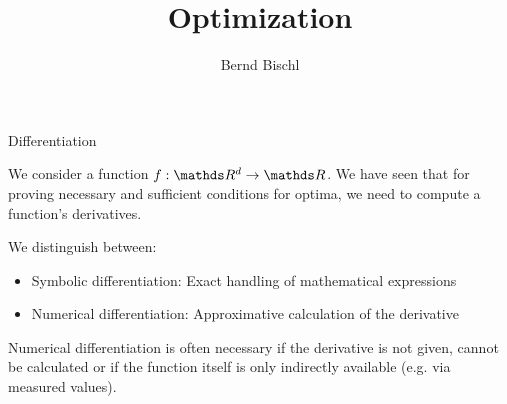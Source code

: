 





\newcommand{\titlefigure}{figure_man/hinge_vs_l2.pdf}
\newcommand{\learninggoals}{
\item TODO
\item TODO}



\title{Optimization}
\author{Bernd Bischl}
\date{}



\sloppy

\begin{vbframe}{Differentiation}

  We consider a function $f: \R^d \rightarrow \R$. We have seen that for proving necessary and sufficient conditions for optima, we need to compute a function's derivatives. 
  
  \lz 
  
  We distinguish between: 
  
  \begin{itemize}
  \item Symbolic differentiation: Exact handling of mathematical expressions
  \item Numerical differentiation: Approximative calculation of the derivative
  \end{itemize}
  
  Numerical differentiation is often necessary if the derivative is not given, cannot be calculated or if the function itself is only indirectly available (e.g. via measured values).
  
  \end{vbframe}
  
